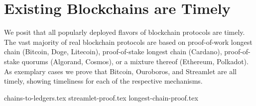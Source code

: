 \section{Existing Blockchains are Timely}\label{sec:possible}

We posit that all popularly deployed flavors of blockchain protocols are timely.
The vast majority of real blockchain protocols are based on proof-of-work longest chain
(Bitcoin, Doge, Litecoin),
proof-of-stake longest chain
(Cardano),
proof-of-stake quorums
(Algorand, Cosmos),
or a mixture thereof
(Ethereum, Polkadot).
As exemplary cases we prove that Bitcoin, Ouroboros, and Streamlet
are all timely, showing timeliness for each of the respective mechanisms.

{chains-to-ledgers.tex}
{streamlet-proof.tex}
{longest-chain-proof.tex}
